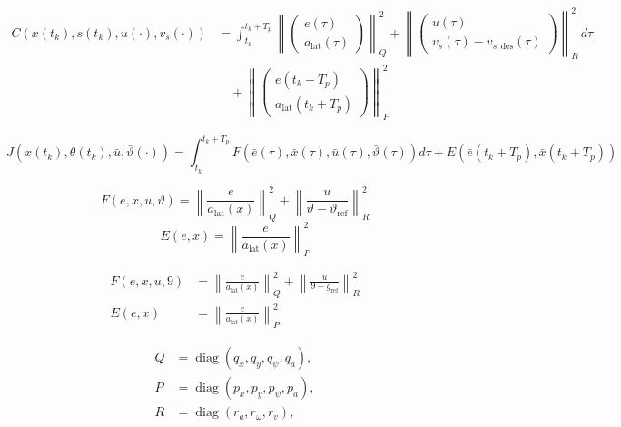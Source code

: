 \begin{equation}
    \begin{aligned}
    C(x(t_k), s(t_k), u(\cdot), v_s(\cdot)) &= \int_{t_k}^{t_k + T_p} \left\| 
    \begin{pmatrix}
    e(\tau) \\
    a_{\text{lat}}(\tau)
    \end{pmatrix}
    \right\|_Q^2 + \left\| 
    \begin{pmatrix}
    u(\tau) \\
    v_s(\tau) - v_{s, \text{des}}(\tau)
    \end{pmatrix}
    \right\|_R^2 \, d\tau \\
    &\quad + \left\| 
    \begin{pmatrix}
    e(t_k + T_p) \\
    a_{\text{lat}}(t_k + T_p)
    \end{pmatrix}
    \right\|_P^2
    \end{aligned}
\end{equation}

\begin{equation}
    J(x(t_k),\theta(t_k),\bar{u},\bar{\vartheta}(\cdot)) = \int_{t_k}^{t_k + T_p} F(\bar{e}(\tau),\bar{x}(\tau),\bar{u}(\tau),\bar{\vartheta}(\tau))d\tau + E(\bar{e}(t_k+T_p),\bar{x}(t_k+T_p))
\end{equation}

\begin{equation}
    F(e, x, u, \vartheta) = 
    \left\| \frac{e}{a_{\text{lat}}(x)} \right\|^2_Q + 
    \left\| \frac{u}{\vartheta - \vartheta_{\text{ref}}} \right\|^2_R
\end{equation}
\begin{equation}
    E(e, x) = \left\| \frac{e}{a_{\text{lat}}(x)} \right\|^2_P
\end{equation}

\begin{align}
    F(e, x, u, 9) &= \left\| \frac{e}{a_{\text{lat}}(x)} \right\|_Q^2 + \left\| \frac{u}{9 - g_{\text{ref}}} \right\|_R^2 \label{eq:F} \\
    E(e, x) &= \left\| \frac{e}{a_{\text{lat}}(x)} \right\|_P^2 \label{eq:E}
\end{align}

\begin{equation}
    \begin{split}
        Q &= \operatorname{diag}(q_x, q_y, q_\psi, q_a), \\
        P &= \operatorname{diag}(p_x, p_y, p_\psi, p_a), \\
        R &= \operatorname{diag}(r_a, r_\omega, r_v),
    \end{split}
\end{equation}

